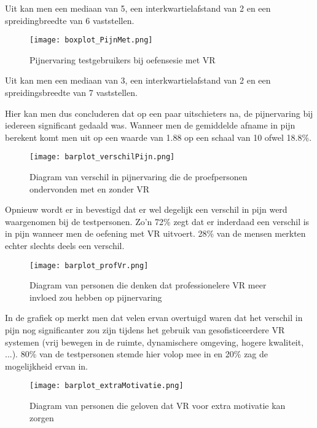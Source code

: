 Uit \cite{figuur 6.5} kan men een mediaan van 5, een interkwartielafstand van 2 en een spreidingbreedte van 6 vaststellen.

\begin{figure}[h]
    \centering
    \texttt{[image: boxplot\_PijnMet.png]}
    \caption{Pijnervaring testgebruikers bij oefensesie met VR}
    \label{figuur 6.6}
\end{figure}

Uit \cite{figuur 6.6} kan men een mediaan van 3, een interkwartielafstand van 2 en een spreidingsbreedte van 7 vaststellen.

Hier kan men dus concluderen dat op een paar uitschieters na, de pijnervaring bij iedereen significant gedaald was. Wanneer men de gemiddelde afname in pijn berekent komt men uit op een waarde van 1.88 op een schaal van 10 ofwel 18.8\%.

\begin{figure}[h]
    \centering
    \texttt{[image: barplot\_verschilPijn.png]}
    \caption{Diagram van verschil in pijnervaring die de proefpersonen ondervonden met en zonder VR}
    \label{figuur 6.7}
\end{figure}

\newpage

Opnieuw wordt er in \cite{figuur 6.7} bevestigd dat er wel degelijk een verschil in pijn werd waargenomen bij de testpersonen. Zo'n 72\% zegt dat er inderdaad een verschil is in pijn wanneer men de oefening met VR uitvoert. 28\% van de mensen merkten echter slechts deels een verschil.

\begin{figure}[h]
    \centering
    \texttt{[image: barplot\_profVr.png]}
    \caption{Diagram van personen die denken dat professionelere VR meer invloed zou hebben op pijnervaring}
    \label{figuur 6.8}
\end{figure}

In de grafiek op \cite{figuur 6.8} merkt men dat velen ervan overtuigd waren dat het verschil in pijn nog significanter zou zijn tijdens het gebruik van gesofisticeerdere VR systemen (vrij bewegen in de ruimte, dynamischere omgeving, hogere kwaliteit, ...). 80\% van de testpersonen stemde hier volop mee in en 20\% zag de mogelijkheid ervan in.

\begin{figure}[h]
    \centering
    \texttt{[image: barplot\_extraMotivatie.png]}
    \caption{Diagram van personen die geloven dat VR voor extra motivatie kan zorgen}
    \label{figuur 6.9}
\end{figure}

